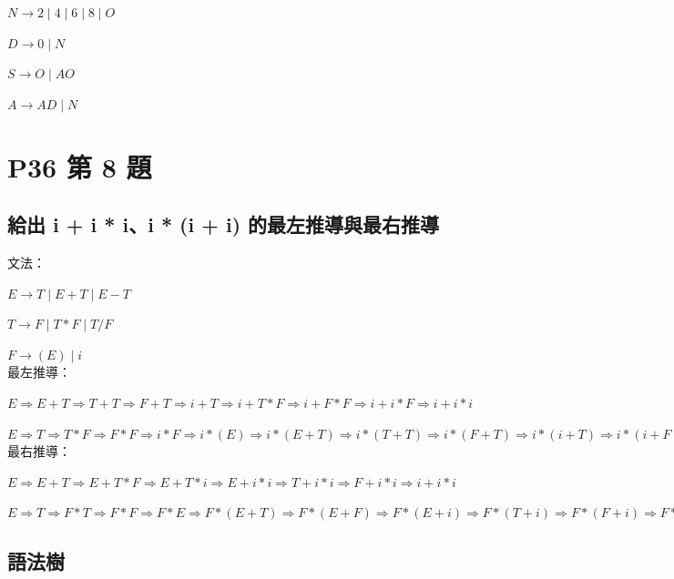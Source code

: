 \documentclass[12pt, a4paper]{article}
\begin{document}
    {$N \rightarrow 2 \mid 4 \mid 6 \mid 8 \mid O$}

    {$D \rightarrow 0 \mid N$}

    {$S \rightarrow O \mid AO$}

    {$A \rightarrow AD \mid N$}

\section{P36 第 8 題}
    \subsection{給出 i + i * i、i * (i + i) 的最左推導與最右推導}

    {文法：}

    {$E \rightarrow T \mid E + T \mid E - T$}

    {$T \rightarrow F \mid T * F \mid T / F$}

    {$F \rightarrow (E) \mid i$}\\

    {最左推導：}

    {$E \Rightarrow E + T \Rightarrow T + T \Rightarrow F + T \Rightarrow i + T \Rightarrow i + T * F \Rightarrow i + F * F \Rightarrow i + i * F \Rightarrow i + i * i$}

    {$E \Rightarrow T \Rightarrow T * F \Rightarrow F * F \Rightarrow i * F \Rightarrow i * (E) \Rightarrow i * (E + T) \Rightarrow i * (T + T) \Rightarrow i * (F + T) \Rightarrow i * (i + T) \Rightarrow i * (i + F) \Rightarrow i * (i + i)$}\\

    {最右推導：}

    {$E \Rightarrow E + T \Rightarrow E + T * F \Rightarrow E + T * i \Rightarrow E + i * i \Rightarrow T + i * i \Rightarrow F + i * i \Rightarrow i + i * i$}

    {$E \Rightarrow T \Rightarrow F * T \Rightarrow F * F \Rightarrow F * E \Rightarrow F * (E + T) \Rightarrow F * (E + F) \Rightarrow F * (E + i) \Rightarrow F * (T + i) \Rightarrow F * (F + i) \Rightarrow F * (i + i) \Rightarrow i * (i + i)$}

    \subsection{語法樹}
\end{document}
